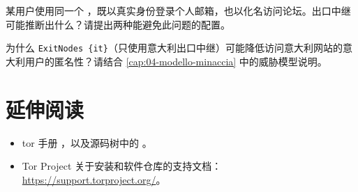 \begin{esercizio}[2]\label{es:17-isolamento}
某用户使用同一个 ，既以真实身份登录个人邮箱，也以化名访问论坛。出口中继可能推断出什么？请提出两种能避免此问题的配置。
\end{esercizio}

\begin{esercizio}[2]\label{es:17-exitnodes}
为什么 \texttt{ExitNodes \{it\}}（只使用意大利出口中继）可能降低访问意大利网站的意大利用户的匿名性？请结合 \cref{cap:04-modello-minaccia} 中的威胁模型说明。
\end{esercizio}

\section*{延伸阅读}
\begin{itemize}
  \item tor 手册 ，以及源码树中的 。
  \item Tor Project 关于安装和软件仓库的支持文档：\url{https://support.torproject.org/}。
\end{itemize}
